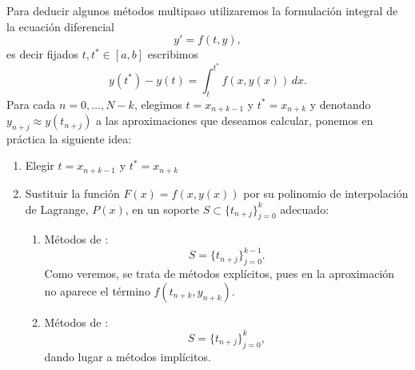 Para deducir algunos métodos multipaso utilizaremos la formulación
integral de la ecuación diferencial
$$
y'=f(t,y),
$$
es decir fijados $t,t^*\in[a,b]$ escribimos
\begin{equation*}
  y(t^*)-y(t) = \int_{t}^{t^*} f(x,y(x))\, dx.
\end{equation*}
Para cada $n=0,...,N-k$, elegimos $t=x_{n+k-1}$ y $t^*=x_{n+k}$ y
denotando $y_{n+j}\approx y(t_{n+j})$ a las aproximaciones que
deseamos calcular,  ponemos en práctica la siguiente idea:
\begin{enumerate}
\item Elegir $t=x_{n+k-1}$ y $t^*=x_{n+k}$
\item Sustituir la función $F(x)=f(x,y(x))$ por su polinomio de
  interpolación de Lagrange, $P(x)$, en un soporte 
  $S\subset \{t_{n+j}\}_{j=0}^k$ adecuado:%
  \begin{enumerate}
  \item Métodos de \emph{\AB}: 
    \begin{equation*}
      S= \{t_{n+j}\}_{j=0}^{k-1}.
    \end{equation*}
    Como veremos, se trata de métodos explícitos, pues en la
    aproximación no aparece el término
    $f(t_{n+k},y_{n+k})$.
  \item  Métodos de \emph{\AM}: 
    \begin{equation*}
      S= \{t_{n+j}\}_{j=0}^{k},
    \end{equation*}
    dando lugar a métodos implícitos.
  \end{enumerate}
\end{enumerate}


